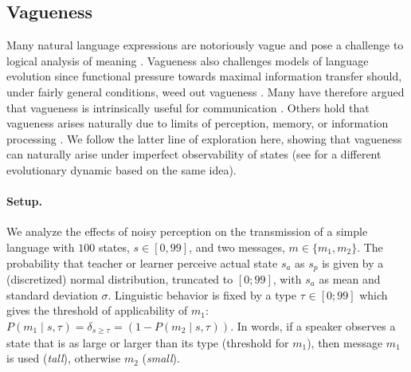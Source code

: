 \documentclass[10pt,a4paper]{article}
\newcommand{\mf}[1]{\textcolor{Red}{[MF: #1]}}
\newcommand{\type}[1]{\ensuremath{\tau_{#1}}}
\begin{document}

\subsection{Vagueness}

Many natural language expressions are notoriously vague and pose a challenge to logical
analysis of meaning \citep[e.g.][]{Williamson1994:Vagueness}. Vagueness also challenges models
of language evolution since functional pressure towards maximal information transfer should,
under fairly general conditions, weed out vagueness \citep{Lipman2009:Why-is-Language}. Many
have therefore argued that vagueness is intrinsically useful for communication
\citep[e.g.][]{Deemter2009:Utility-and-Lan,Jaegherde-JaegherRooijvan-Rooij2010:Strategic-Vague,BlumeBoard2013:Intentional-Vag}. Others
hold that vagueness arises naturally due to limits of perception, memory, or information
processing
\citep[e.g.][]{FrankeJager2010:Vagueness-Signa,OConnor2013:The-Evolution-o,LassiterGoodman2015:Adjectival-vagu}. We
follow the latter line of exploration here, showing that vagueness can naturally arise under
imperfect observability of states (see \cite{franke+correia:toappear} for a different
evolutionary dynamic based on the same idea).

\paragraph{Setup.}  We analyze the effects of noisy perception on the transmission of a simple
language with $100$ states, $s \in [0,99]$, and two messages, $m \in \{m_1,m_2\}$. The
probability that teacher or learner perceive actual state $s_a$ as $s_p$ is given by a (discretized) normal
distribution, truncated to $[0;99]$, with $s_a$ as mean and standard deviation
$\sigma$. %
Linguistic behavior is fixed by a type $\type{} \in [0;99]$ which gives the threshold of applicability
of $m_1$: $P(m_1 \mid s,\type{}) = \delta_{s \ge \type{}} = (1 - P(m_2 \mid s,\type{}))$. In words, if a speaker observes a
state that is as large or larger than its type (threshold for $m_1$), then message $m_1$ is
used (\emph{tall}), otherwise $m_2$ ({\em small}).
\end{document}
